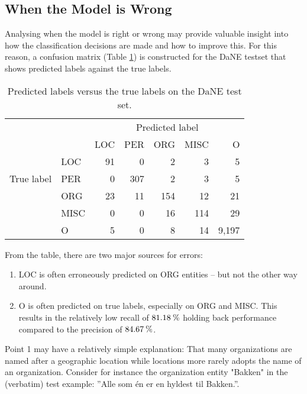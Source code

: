 \documentclass[main.tex]{subfiles}
\begin{document}
\subsection{When the Model is Wrong}

Analysing when the model is right or wrong may provide valuable insight into how the classification decisions are made and how to improve this.
For this reason, a confusion matrix (Table \ref{tab:pred-true-confmat}) is constructed for the DaNE testset that shows predicted labels against the true labels\footnotemark.


\begin{table}[H]
    \centering
    \small
    \begin{tabular}{l l | r r r r r }
        & &	\multicolumn{5}{c}{Predicted label}	\\
        \multirow{5}{*}{True label} & & LOC & PER & ORG & MISC & O \\\hline
            & LOC  & 91 & 0    & 2   & 3   & 5   \\
            & PER  & 0  & 307  & 2   & 3   & 5   \\
            & ORG  & 23 & 11   & 154 & 12  & 21  \\
            & MISC & 0  & 0    & 16  & 114 & 29  \\
            & O    & 5  & 0    & 8   & 14  & 9,197
    \end{tabular}
    \caption{Predicted labels versus the true labels on the DaNE test set.}
    \label{tab:pred-true-confmat}
\end{table}\noindent
From the table, there are two major sources for errors:
\begin{enumerate}
    \item LOC is often erroneously predicted on ORG entities -- but not the other way around.
    \item O is often predicted on true labels, especially on ORG and MISC. This results in the relatively low recall of $81.18\:\text{\%{}}$ holding back performance compared to the precision of $84.67\:\text{\%{}}$.
\end{enumerate}
Point 1 may have a relatively simple explanation: 
That many organizations are named after a geographic location while locations more rarely adopts the name of an organization.
Consider for instance the organization entity "Bakken" in the (verbatim) test example: ''Alle som én er en hyldest til Bakken.''.
\end{document}
